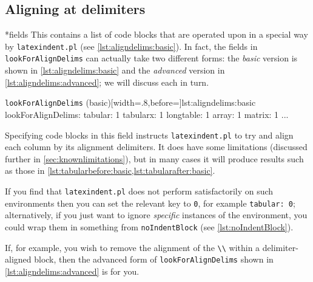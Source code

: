 \subsection{Aligning at delimiters}
*{fields}
	This contains a list of code blocks that are operated upon in a special way by
	\texttt{latexindent.pl} (see \cref{lst:aligndelims:basic}). In fact, the fields in
	\texttt{lookForAlignDelims} can actually take two different forms: the \emph{basic}
	version is shown in \cref{lst:aligndelims:basic} and the \emph{advanced} version in
	\cref{lst:aligndelims:advanced}; we will discuss each in turn.

	\begin{yaml}[numbers=none]{\texttt{lookForAlignDelims} (basic)}[width=.8\linewidth,before=\centering]{lst:aligndelims:basic}
lookForAlignDelims:
   tabular: 1
   tabularx: 1
   longtable: 1
   array: 1
   matrix: 1
   ...
	\end{yaml}

	Specifying code blocks in this field instructs \texttt{latexindent.pl} to try and align
	each column by its alignment delimiters. It does have some limitations (discussed further
	in \cref{sec:knownlimitations}), but in many cases it will produce results such as those
	in \cref{lst:tabularbefore:basic,lst:tabularafter:basic}.

	If you find that \texttt{latexindent.pl} does not perform satisfactorily on such
	environments then you can set the relevant key to \texttt{0}, for example
	\texttt{tabular: 0}; alternatively, if you just want to ignore \emph{specific} instances
	of the environment, you could wrap them in something from \texttt{noIndentBlock} (see
	\vref{lst:noIndentBlock}).

	\begin{cmhtcbraster}
	\end{cmhtcbraster}

	If, for example, you wish to remove the alignment of the \lstinline!\\! within a
	delimiter-aligned block, then the advanced form of \texttt{lookForAlignDelims} shown in
	\cref{lst:aligndelims:advanced} is for you.

